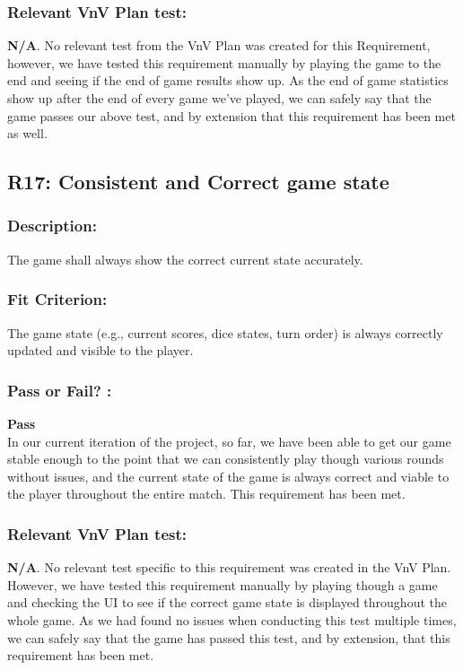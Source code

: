 \documentclass[12pt, titlepage]{article}
\begin{document}
 \subsubsection*{Relevant VnV Plan test: } \textbf{N/A}. No relevant test from the VnV Plan was created for this Requirement, however, we have tested this requirement manually by playing the game to the end and seeing if the end of game results show up. As the end of game statistics show up after the end of every game we've played, we can safely say that the game passes our above test, and by extension that this requirement has been met as well.


\subsection{R17: Consistent and Correct game state} 
\label{R17} 

\subsubsection*{Description:} The game shall always show the correct current state accurately.

\subsubsection*{Fit Criterion:}The game state (e.g., current scores, dice states, turn order) is always correctly updated and visible to the player.

\subsubsection*{Pass or Fail? :} 

 \noindent \textbf{Pass}\\
 
 \noindent In our current iteration of the project, so far, we have been able to get our game stable enough to the point that we can consistently play though various rounds without issues, and the current state of the game is always correct and viable to the player throughout the entire match. This requirement has been met.
 
 \subsubsection*{Relevant VnV Plan test: } \textbf{N/A}. No relevant test specific to this requirement was created in the VnV Plan. However, we have tested this requirement manually by  playing though a game and checking the UI to see if the correct game state is displayed throughout the whole game. As we had found no issues when conducting this test multiple times, we can safely say that the game has passed this test, and by extension, that this requirement has been met.
\end{document}
